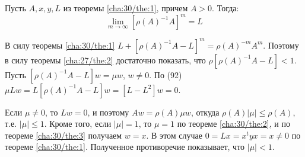 \begin{theorem}[]\label{cha:31/the:1}
	Пусть $A, x, y, L$ из теоремы \ref{cha:30/the:1}, причем $A > 0$. Тогда: 
	$$\underset{m \to \infty}{\lim}[{\rho(A)}^{−1}A]^m = L$$
\end{theorem}
\begin{Proof}
	В силу теоремы \ref{cha:30/the:1} $\displaystyle L + \left[\rho(A)^{−1}A − L\right]^m = \rho(A)^{−m}A^m$. Поэтому в силу теоремы \ref{cha:27/the:2} достаточно показать, что $\displaystyle \rho \left[ \rho(A)^{−1}A − L\right] < 1$. Пусть $[\rho(A)^{−1}A−L]w = \mu w$, $w \not = 0$. По (92) $\displaystyle \mu L w = L [\rho(A)^{−1}A − L] w = [L − L^2]w = 0$.

	Если $\mu \not = 0$, то $Lw = 0$, и поэтому $Aw = \rho(A)\mu w$, откуда $\rho(A)|\mu| \le \rho(A)$, т.е. $|\mu| \le 1$. Кроме того, если $|\mu| = 1$, то $\mu = 1$ по теореме \ref{cha:30/the:2}, и по теореме \ref{cha:30/the:3} получаем $w = x$. В этом случае $0 = Lx = x^tyx = x \not = 0$ по теореме \ref{cha:30/the:1}. Полученное противоречие показывает, что $|\mu| < 1$.
\end{Proof}


























